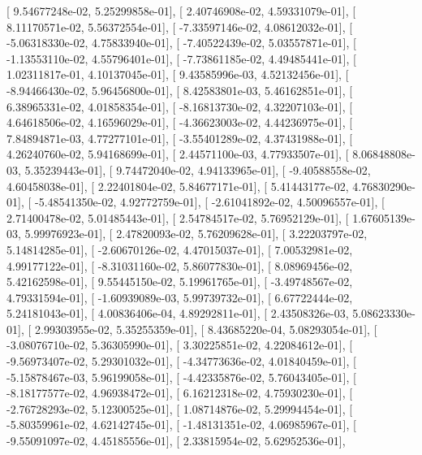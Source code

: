 \documentclass{article}
\begin{document}
       [  9.54677248e-02,   5.25299858e-01],
       [  2.40746908e-02,   4.59331079e-01],
       [  8.11170571e-02,   5.56372554e-01],
       [ -7.33597146e-02,   4.08612032e-01],
       [ -5.06318330e-02,   4.75833940e-01],
       [ -7.40522439e-02,   5.03557871e-01],
       [ -1.13553110e-02,   4.55796401e-01],
       [ -7.73861185e-02,   4.49485441e-01],
       [  1.02311817e-01,   4.10137045e-01],
       [  9.43585996e-03,   4.52132456e-01],
       [ -8.94466430e-02,   5.96456800e-01],
       [  8.42583801e-03,   5.46162851e-01],
       [  6.38965331e-02,   4.01858354e-01],
       [ -8.16813730e-02,   4.32207103e-01],
       [  4.64618506e-02,   4.16596029e-01],
       [ -4.36623003e-02,   4.44236975e-01],
       [  7.84894871e-03,   4.77277101e-01],
       [ -3.55401289e-02,   4.37431988e-01],
       [  4.26240760e-02,   5.94168699e-01],
       [  2.44571100e-03,   4.77933507e-01],
       [  8.06848808e-03,   5.35239443e-01],
       [  9.74472040e-02,   4.94133965e-01],
       [ -9.40588558e-02,   4.60458038e-01],
       [  2.22401804e-02,   5.84677171e-01],
       [  5.41443177e-02,   4.76830290e-01],
       [ -5.48541350e-02,   4.92772759e-01],
       [ -2.61041892e-02,   4.50096557e-01],
       [  2.71400478e-02,   5.01485443e-01],
       [  2.54784517e-02,   5.76952129e-01],
       [  1.67605139e-03,   5.99976923e-01],
       [  2.47820093e-02,   5.76209628e-01],
       [  3.22203797e-02,   5.14814285e-01],
       [ -2.60670126e-02,   4.47015037e-01],
       [  7.00532981e-02,   4.99177122e-01],
       [ -8.31031160e-02,   5.86077830e-01],
       [  8.08969456e-02,   5.42162598e-01],
       [  9.55445150e-02,   5.19961765e-01],
       [ -3.49748567e-02,   4.79331594e-01],
       [ -1.60939089e-03,   5.99739732e-01],
       [  6.67722444e-02,   5.24181043e-01],
       [  4.00836406e-04,   4.89292811e-01],
       [  2.43508326e-03,   5.08623330e-01],
       [  2.99303955e-02,   5.35255359e-01],
       [  8.43685220e-04,   5.08293054e-01],
       [ -3.08076710e-02,   5.36305990e-01],
       [  3.30225851e-02,   4.22084612e-01],
       [ -9.56973407e-02,   5.29301032e-01],
       [ -4.34773636e-02,   4.01840459e-01],
       [ -5.15878467e-03,   5.96199058e-01],
       [ -4.42335876e-02,   5.76043405e-01],
       [ -8.18177577e-02,   4.96938472e-01],
       [  6.16212318e-02,   4.75930230e-01],
       [ -2.76728293e-02,   5.12300525e-01],
       [  1.08714876e-02,   5.29994454e-01],
       [ -5.80359961e-02,   4.62142745e-01],
       [ -1.48131351e-02,   4.06985967e-01],
       [ -9.55091097e-02,   4.45185556e-01],
       [  2.33815954e-02,   5.62952536e-01],
\end{document}

